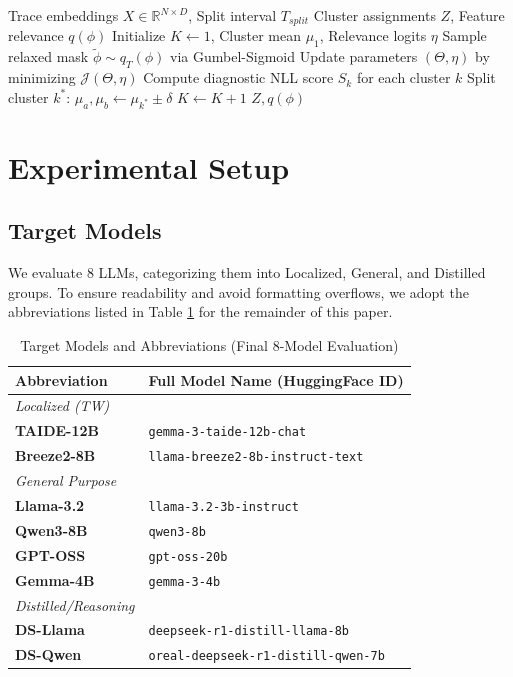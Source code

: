 \documentclass[conference]{IEEEtran}
\begin{document}
\begin{algorithm}[htbp]
\caption{DIVI Dynamic Clustering for Red Teaming \cite{anonymous2025divi}}
\label{alg:divi}
\begin{algorithmic}[1]
\REQUIRE Trace embeddings $X \in \mathbb{R}^{N \times D}$, Split interval $T_{split}$
\ENSURE Cluster assignments $Z$, Feature relevance $q(\phi)$
\STATE Initialize $K \leftarrow 1$, Cluster mean $\mu_1$, Relevance logits $\eta$
    \STATE Sample relaxed mask $\tilde{\phi} \sim q_T(\phi)$ via Gumbel-Sigmoid
    \STATE Update parameters $(\Theta, \eta)$ by minimizing $\mathcal{J}(\Theta, \eta)$
        \STATE Compute diagnostic NLL score $S_k$ for each cluster $k$
            \STATE Split cluster $k^*$: $\mu_a, \mu_b \leftarrow \mu_{k^*} \pm \delta$
            \STATE $K \leftarrow K + 1$
        \ENDIF
    \ENDIF
\ENDFOR
\RETURN $Z, q(\phi)$
\end{algorithmic}
\end{algorithm}

\section{Experimental Setup}
\subsection{Target Models}
We evaluate 8 LLMs, categorizing them into Localized, General, and Distilled groups. To ensure readability and avoid formatting overflows, we adopt the abbreviations listed in Table \ref{tab:model_mapping} for the remainder of this paper.

\begin{table}[h]
\centering
\footnotesize
\caption{Target Models and Abbreviations (Final 8-Model Evaluation)}
\label{tab:model_mapping}
\begin{tabularx}{\columnwidth}{l X}
\toprule
\textbf{Abbreviation} & \textbf{Full Model Name (HuggingFace ID)} \\
\midrule
\textit{Localized (TW)} & \\
\textbf{TAIDE-12B} & \texttt{gemma-3-taide-12b-chat} \\
\textbf{Breeze2-8B} & \texttt{llama-breeze2-8b-instruct-text} \\
\midrule
\textit{General Purpose} & \\
\textbf{Llama-3.2} & \texttt{llama-3.2-3b-instruct} \\
\textbf{Qwen3-8B} & \texttt{qwen3-8b} \\
\textbf{GPT-OSS} & \texttt{gpt-oss-20b} \\
\textbf{Gemma-4B} & \texttt{gemma-3-4b} \\
\midrule
\textit{Distilled/Reasoning} & \\
\textbf{DS-Llama} & \texttt{deepseek-r1-distill-llama-8b} \\
\textbf{DS-Qwen} & \texttt{oreal-deepseek-r1-distill-qwen-7b} \\
\bottomrule
\end{tabularx}
\end{table}
\end{document}
